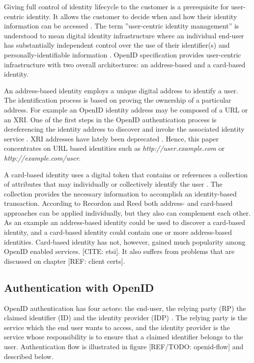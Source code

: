 \documentclass{tktltiki}
\begin{document}
    Giving full control of identity lifecycle to the customer is a prerequisite for user-centric identity. It allows the customer to decide when and how their identity information can be accessed \cite{open_identity_management_saas_2009}. The term ''user-centric identity management'' is understood to mean digital identity infrastructure where an individual end-user has substantially independent control over the use of their identifier(s) and personally-identifiable information \cite{openid_2.0_platform_2009}. OpenID specification provides user-centric infrastructure with two overall architectures: an address-based and a card-based identity.

    An address-based identity employs a unique digital address to identify a user. The identification process is based on proving the ownership of a particular address. For example an OpenID identity address may be composed of a URL or an XRI. One of the first steps in the OpenID authentication process is dereferencing the identity address to discover and invoke the associated identity service \cite{openid_2.0_platform_2009}. XRI addresses have lately been deprecated \cite{xri_depcrecated_08a, xri_depcrecated_08b, xri_depcrecated_08c, xri_depcrecated_08d}. Hence, this paper concentrates on URL based identities such as \emph{http://user.example.com} or \emph{http://example.com/user}.

    A card-based identity uses a digital token that contains or references a collection of attributes that may individually or collectively identify the user \cite{openid_2.0_platform_2009}. The collection provides the necessary information to accomplish an identity-based transaction. According to Recordon and Reed \cite{openid_2.0_platform_2009} both address- and card-based approaches can be applied individually, but they also can complement each other. As an example an address-based identity could be used to discover a card-based identity, and a card-based identity could contain one or more address-based identities. Card-based identity has not, however, gained much popularity among OpenID enabled services. [CITE: etsi]. It also suffers from problems that are discussed on chapter [REF: client certs].

        
      
\subsection{Authentication with OpenID}

    OpenID authentication has four actors: the end-user, the relying party (RP) the claimed identifier (ID) and the identity provider (IDP) \cite{openid_2.0_platform_2009}. The relying party is the service which the end user wants to access, and the identity provider is the service whose responsibility is to ensure that a claimed identifier belongs to the user. Authentication flow is illustrated in figure [REF/TODO: openid-flow] and described below.
          
\end{document}
